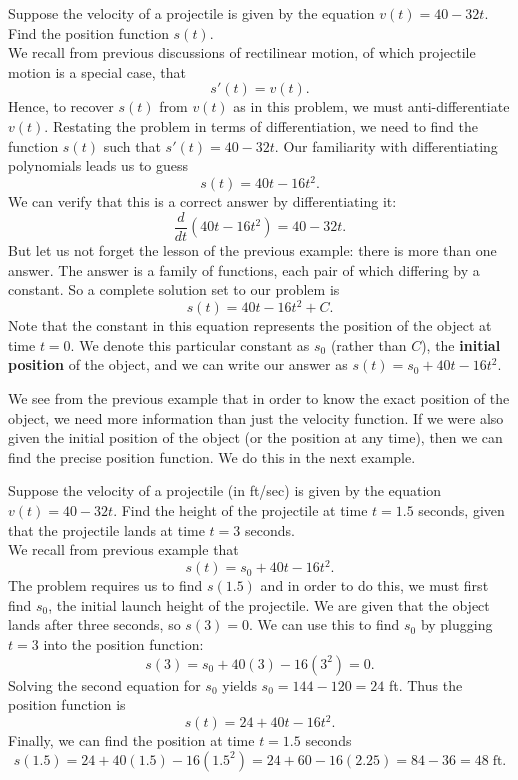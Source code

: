 \documentclass[handout]{ximera}
\begin{document}
\begin{example}[example 2]
Suppose the velocity of a projectile is given by the equation $v(t) = 40 - 32t$. Find the position function $s(t)$.\\
We recall from previous discussions of rectilinear motion, of which projectile motion is a special case, that
\[
s'(t) = v(t).
\]
Hence, to recover $s(t)$ from $v(t)$ as in this problem, we must anti-differentiate $v(t)$.
Restating the problem in terms of differentiation, we need to find the function $s(t)$ such that $s'(t) = 40 - 32t$.
Our familiarity with differentiating polynomials leads us to guess
\[
s(t) = 40t - 16t^2.
\]
We can verify that this is a correct answer by differentiating it:
\[
\frac{d}{dt}\left(40t - 16t^2\right) = 40 - 32t.
\]
But let us not forget the lesson of the previous example: there is more than one answer.  The answer is a family of functions,
each pair of which differing by a constant. So a complete solution set to our problem is
\[
s(t) = 40t - 16t^2 + C.
\]
Note that the constant in this equation represents the position of the object at time $t = 0$.
We denote this particular constant as $s_0$ (rather than $C$), the \textbf{initial position} of the object, and we can write our answer as 
$s(t) = s_0 + 40t - 16t^2$.


\end{example}






We see from the previous example that in order to know the exact position of the object, 
we need more information than just the velocity function.
If we were also given the initial position of the object (or the position at any time), 
then we can find the precise position function.
We do this in the next example.

\begin{example}[example 3]
Suppose the velocity of a projectile (in ft/sec) is given by the equation $v(t) = 40 - 32t$. 
Find the height of the projectile at time $t = 1.5$ seconds, 
given that the projectile lands at time $t = 3$ seconds. \\

We recall from previous example that 
\[
s(t) = s_0 + 40t - 16t^2.
\]
The problem requires us to find $s(1.5)$ and in order to do this, we must first find $s_0$, 
the initial launch height of the projectile.
We are given that the object lands after three seconds, so $s(3) = 0$. We can use this to find $s_0$
by plugging $t=3$ into the position function:
\[
s(3) = s_0 + 40(3) - 16(3^2) = 0.
\]
Solving the second equation for $s_0$ yields $s_0 = 144 - 120 = 24$ ft.
Thus the position function is
\[
s(t) = 24 + 40t - 16t^2.
\]
Finally, we can find the position at time $t=1.5$ seconds
\[
s(1.5) = 24 + 40(1.5) - 16(1.5^2) = 24 + 60 - 16(2.25) = 84 - 36 = 48 \; \text{ft}.
\]
\end{example}
\end{document}
